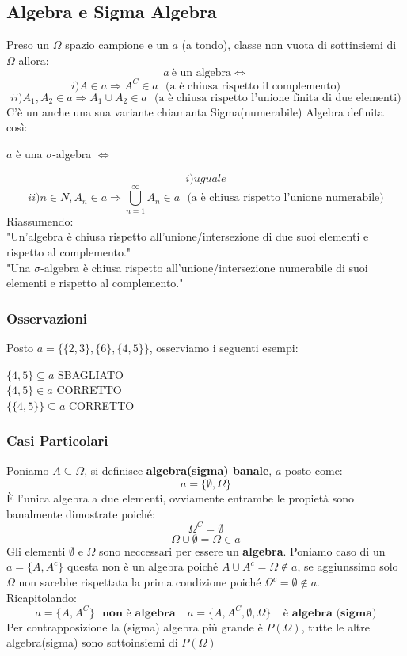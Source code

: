 \subsection{Algebra e Sigma Algebra}
Preso un $\Omega$ spazio campione e un $a$ (a tondo), classe non vuota di sottinsiemi di $\Omega$ allora:
$$ a \: \text{è un algebra} \Leftrightarrow $$
$$ i) A \in a \Rightarrow A^C \in a \:\:\: \text{(a è chiusa rispetto il complemento)} $$
$$ ii) A_1, A_2 \in a \Rightarrow A_1 \cup A_2 \in a \:\:\: \text{(a è chiusa rispetto l'unione finita di due elementi)} $$
C'è un anche una sua variante chiamanta Sigma(numerabile) Algebra definita così:\\
\begin{center}
$a$ è una $\sigma$-algebra $\Leftrightarrow $
\end{center}
$$ i)uguale $$
$$ ii) n \in N, A_n \in a \Rightarrow \bigcup_{n=1}^{\infty} A_n \in a \:\:\: \text{(a è chiusa rispetto l'unione numerabile)}$$
Riassumendo:\\
"Un'algebra è chiusa rispetto all'unione/intersezione di due suoi elementi e rispetto al complemento."\\
"Una $\sigma$-algebra è chiusa rispetto all'unione/intersezione numerabile di suoi elementi e rispetto al complemento."
\subsubsection{Osservazioni}
Posto $a=\{\{2,3\}, \{6\}, \{4,5\}\}$, osserviamo i seguenti esempi:
\begin{center}
$ \{4,5\} \subseteq a $ SBAGLIATO\\
$ \{4,5\} \in a $ CORRETTO\\
$ \{\{4,5\}\} \subseteq a $ CORRETTO
\end{center}

\subsubsection{Casi Particolari}
Poniamo $A \subseteq \Omega$, si definisce \textbf{algebra(sigma) banale}, $a$ posto come:
$$ a = \{\emptyset, \Omega \}$$
È l'unica algebra a due elementi, ovviamente entrambe le propietà sono banalmente dimostrate poiché:
$$ \Omega^C = \emptyset $$
$$ \Omega \cup \emptyset = \Omega \in a $$
Gli elementi $\emptyset$ e $\Omega$ sono neccessari per essere un \textbf{algebra}.
Poniamo caso di un $a=\{A, A^c\}$ questa non è un algebra poiché $A \cup A^c = \Omega \not \in a$, se aggiunssimo solo $\Omega$ non sarebbe rispettata la prima condizione poiché $ \Omega^c = \emptyset \not \in a$.\\
Ricapitolando:
$$ a=\{A, A^C\} \:\:\: \textbf{non è algebra} \:\:\:\:\: a=\{A,A^C,\emptyset,\Omega\} \:\:\:\:\:\textbf{è algebra (sigma)}$$
Per contrapposizione la (sigma) algebra più grande è $P(\Omega)$, tutte le altre algebra(sigma) sono sottoinsiemi di $P(\Omega)$

